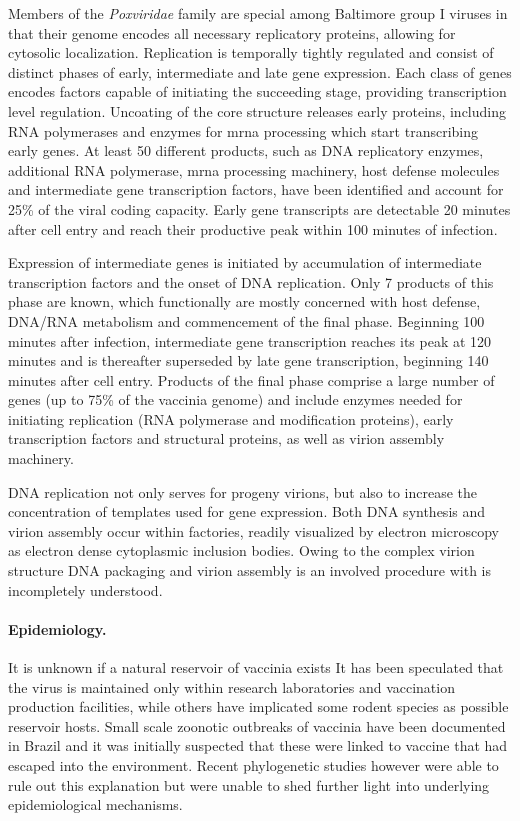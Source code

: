 Members of the \textit{Poxviridae} family are special among Baltimore group I viruses in that their genome encodes all necessary replicatory proteins, allowing for cytosolic localization. Replication is temporally tightly regulated and consist of distinct phases of early, intermediate and late gene expression. Each class of genes encodes factors capable of initiating the succeeding stage, providing transcription level regulation. Uncoating of the core structure releases early proteins, including RNA polymerases and enzymes for \gls{mrna} processing which start transcribing early genes. At least 50 different products, such as DNA replicatory enzymes, additional RNA polymerase, \gls{mrna} processing machinery, host defense molecules and intermediate gene transcription factors, have been identified and account for 25\% of the viral coding capacity. Early gene transcripts are detectable 20 minutes after cell entry and reach their productive peak within 100 minutes of infection.

Expression of intermediate genes is initiated by accumulation of intermediate  transcription factors and the onset of DNA replication. Only 7 products of this phase are known, which functionally are mostly concerned with host defense, DNA/RNA metabolism and commencement of the final phase. Beginning 100 minutes after infection, intermediate gene transcription reaches its peak at 120 minutes and is thereafter superseded by late gene transcription, beginning 140 minutes after cell entry. Products of the final phase comprise a large number of genes (up to 75\% of the vaccinia genome) and include enzymes needed for initiating replication (RNA polymerase and modification proteins), early transcription factors and structural proteins, as well as virion assembly machinery.

DNA replication not only serves for progeny virions, but also to increase the concentration of templates used for gene expression. Both DNA synthesis and virion assembly occur within factories, readily visualized by electron microscopy as electron dense cytoplasmic inclusion bodies. Owing to the complex virion structure DNA packaging and virion assembly is an involved procedure with is incompletely understood.

\paragraph{Epidemiology.}
It is unknown if a natural reservoir of vaccinia exists It has been speculated that the virus is maintained only within research laboratories and vaccination production facilities, while others have implicated some rodent species as possible reservoir hosts. Small scale zoonotic outbreaks of vaccinia have been documented in Brazil and it was initially suspected that these were linked to vaccine that had escaped into the environment. Recent phylogenetic studies however were able to rule out this explanation but were unable to shed further light into underlying epidemiological mechanisms.

